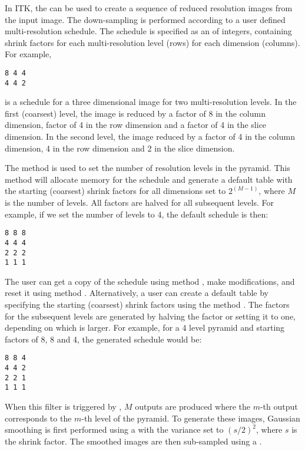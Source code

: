 

In ITK, the  can be used to create
a sequence of reduced resolution images from the input image.  The
down-sampling is performed according to a user defined multi-resolution
schedule. The schedule is specified as an  of integers,
containing shrink factors for each multi-resolution level (rows) for each
dimension (columns). For example,

\small
\begin{verbatim}
8 4 4
4 4 2
\end{verbatim}
\normalsize

is a schedule for a three dimensional image for two multi-resolution levels.
In the first (coarsest) level, the image is reduced by a factor of 8
in the column dimension, factor of 4 in the row dimension and a factor
of 4 in the slice dimension. In the second level, the image reduced
by a factor of 4 in the column dimension, 4 in the row dimension and
2 in the slice dimension.


The method  is used to set the number of
resolution levels in the pyramid. This method will allocate memory
for the schedule and generate a default table with the starting
(coarsest) shrink factors for all dimensions set to $2^(M-1)$,
where $M$ is the number of levels. All factors are halved for
all subsequent levels. For example, if we set the number of levels
to 4, the default schedule is then:

\small
\begin{verbatim}
8 8 8
4 4 4
2 2 2
1 1 1
\end{verbatim}
\normalsize


The user can get a copy of the schedule using method ,
make modifications, and reset it using method .
Alternatively, a user can create a default table by specifying the
starting (coarsest) shrink factors using the method
. The factors for the subsequent
levels are generated by halving the factor or setting it to one,
depending on which is larger. For example, for a 4 level pyramid
and starting factors of 8, 8 and 4, the generated schedule would be:

\small
\begin{verbatim}
8 8 4
4 4 2
2 2 1
1 1 1
\end{verbatim}
\normalsize

When this filter is triggered by , $M$ outputs are produced
where the $m$-th output corresponds to the $m$-th level of the pyramid.
To generate these images, Gaussian smoothing is first performed using a
 with the variance set to $(s/2)^2$,
where $s$ is the shrink factor. The smoothed images are then sub-sampled using
a .
